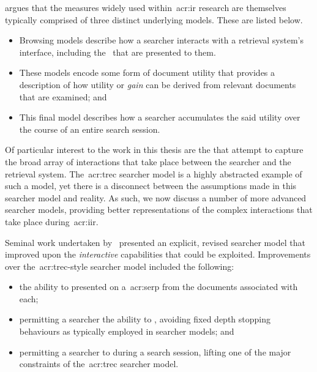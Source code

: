 \cite{carterette2011effectiveness_evaluation} argues that the measures widely used within~\gls{acr:ir} research are themselves typically comprised of three distinct underlying models. These are listed below.

\begin{itemize}
    \item{ Browsing models describe how a searcher interacts with a retrieval system's interface, including the~ that are presented to them.}
    \item{ These models encode some form of document utility that provides a description of how utility or \emph{gain} can be derived from relevant documents that are examined; and}
    \item{ This final model describes how a searcher accumulates the said utility over the course of an entire search session.}
\end{itemize}

Of particular interest to the work in this thesis are the  that attempt to capture the broad array of interactions that take place between the searcher and the retrieval system. The~\gls{acr:trec} searcher model is a highly abstracted example of such a model, yet there is a disconnect between the assumptions made in this searcher model and reality. As such, we now discuss a number of more advanced searcher models, providing better representations of the complex interactions that take place during~\gls{acr:iir}.

Seminal work undertaken by~\cite{baskaya2013behavioural_factors} presented an explicit, revised searcher model that improved upon the \emph{interactive} capabilities that could be exploited. Improvements over the~\gls{acr:trec}-style searcher model included the following:

\begin{itemize}
    \item{the ability to  presented on a~\gls{acr:serp} from the documents associated with each;}
    \item{permitting a searcher the ability to , avoiding fixed depth stopping behaviours as typically employed in searcher models; and}
    \item{permitting a searcher to  during a search session, lifting one of the major constraints of the~\gls{acr:trec} searcher model.}
\end{itemize}


